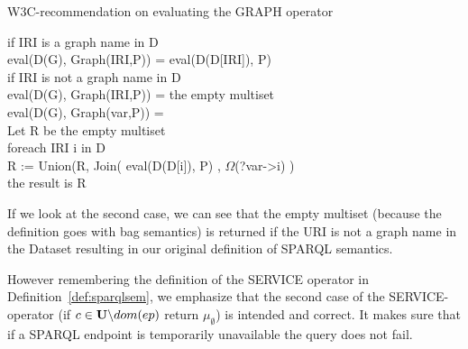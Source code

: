 			\begin{algorithm}
				\caption{W3C-recommendation on evaluating the GRAPH operator}
			if IRI is a graph name in D\\
				\quad eval(D(G), Graph(IRI,P)) = eval(D(D[IRI]), P)\\
			if IRI is not a graph name in D\\
				\quad eval(D(G), Graph(IRI,P)) = the empty multiset\\
				\quad eval(D(G), Graph(var,P)) =\\
			Let R be the empty multiset\\
				\quad foreach IRI i in D\\
					\qquad R := Union(R, Join( eval(D(D[i]), P) , $\Omega$(?var->i) )\\
			the result is R
		\end{algorithm}

			If we look at the second case, we can see that the empty multiset (because the
			definition goes with bag semantics)
			is returned if the URI is not a graph name in the Dataset resulting
			in our original definition of SPARQL semantics. 
			
			However remembering the definition of the SERVICE
			operator in Definition~\ref{def:sparqlsem}, we emphasize
			that the second case of the SERVICE-operator (if $c \in \mathbf{U} \backslash
			dom(ep)$ return $\mu_\emptyset$) is intended and correct. It makes
			sure that if a SPARQL endpoint is temporarily unavailable the query
			does not fail.
			

